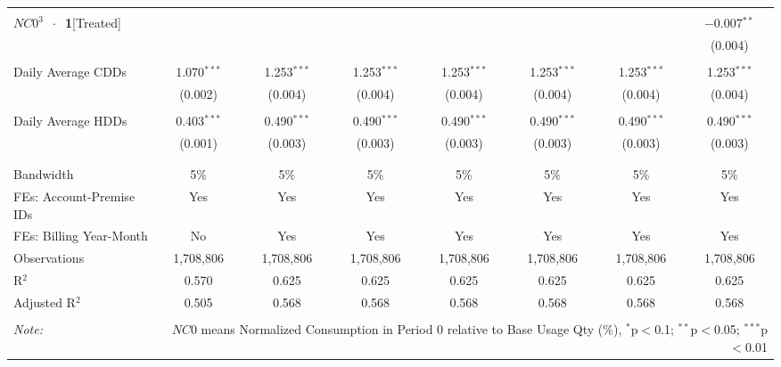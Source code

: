 \begin{table}[!htbp]
\begin{adjustbox}{scale = 0.65}
\begin{tabular}{@{\extracolsep{50pt}}lccccccc}
  & & & & & & & \\ 
 $NC0^{3}$ $\ \cdot \ $ \textbf{1}[Treated] &  &  &  &  &  &  & $-$0.007$^{**}$ \\ 
  &  &  &  &  &  &  & (0.004) \\ 
  & & & & & & & \\ 
 Daily Average CDDs & 1.070$^{***}$ & 1.253$^{***}$ & 1.253$^{***}$ & 1.253$^{***}$ & 1.253$^{***}$ & 1.253$^{***}$ & 1.253$^{***}$ \\ 
  & (0.002) & (0.004) & (0.004) & (0.004) & (0.004) & (0.004) & (0.004) \\ 
  & & & & & & & \\ 
 Daily Average HDDs & 0.403$^{***}$ & 0.490$^{***}$ & 0.490$^{***}$ & 0.490$^{***}$ & 0.490$^{***}$ & 0.490$^{***}$ & 0.490$^{***}$ \\ 
  & (0.001) & (0.003) & (0.003) & (0.003) & (0.003) & (0.003) & (0.003) \\ 
  & & & & & & & \\ 
\hline \\[-1.8ex] 
Bandwidth & 5\% & 5\% & 5\% & 5\% & 5\% & 5\% & 5\% \\ 
FEs: Account-Premise IDs & Yes & Yes & Yes & Yes & Yes & Yes & Yes \\ 
FEs: Billing Year-Month & No & Yes & Yes & Yes & Yes & Yes & Yes \\ 
Observations & 1,708,806 & 1,708,806 & 1,708,806 & 1,708,806 & 1,708,806 & 1,708,806 & 1,708,806 \\ 
R$^{2}$ & 0.570 & 0.625 & 0.625 & 0.625 & 0.625 & 0.625 & 0.625 \\ 
Adjusted R$^{2}$ & 0.505 & 0.568 & 0.568 & 0.568 & 0.568 & 0.568 & 0.568 \\ 
\hline 
\hline \\[-1.8ex] 
\textit{Note:}  & \multicolumn{7}{r}{$NC0$ means Normalized Consumption in Period 0 relative to Base Usage Qty (\%), $^{*}$p$<$0.1; $^{**}$p$<$0.05; $^{***}$p$<$0.01} \\ 
\end{tabular}
\end{adjustbox}
\end{table} 
